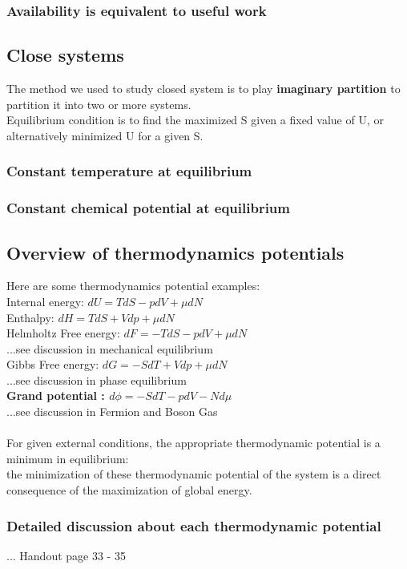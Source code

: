 \documentclass[10pt,a4paper]{article}
\begin{document}
    \subsubsection{Availability is equivalent to useful work}

    \subsection{Close systems}
    The method we used to study closed system is to play \textbf{imaginary partition}
    to partition it into two or more systems.\\
    Equilibrium condition is to find the maximized S given a fixed value of U, or alternatively
    minimized U for a given S.
    \subsubsection{Constant temperature at equilibrium}
    \subsubsection{Constant chemical potential at equilibrium}
    \subsection{Overview of thermodynamics potentials}
    Here are some thermodynamics potential examples:\\
    Internal energy: $dU = TdS - pdV+\mu dN$\\
    Enthalpy: $dH = TdS + Vdp +\mu dN$\\
    Helmholtz Free energy: $dF = -TdS -pdV + \mu dN$\\ ...see discussion in mechanical equilibrium \\
    Gibbs Free energy: $dG = -SdT + Vdp +\mu dN$\\ ...see discussion in phase equilibrium \\
    \textbf{Grand potential : $d\phi = -SdT -pdV - Nd\mu$}\\ ...see discussion in Fermion and Boson Gas \\
    \\
    For given external conditions, the appropriate thermodynamic potential is a minimum in equilibrium:\\
    the minimization of these thermodynamic potential of the system is a direct consequence of the maximization of global energy.
    \subsubsection{Detailed discussion about each thermodynamic potential}
    ... Handout page 33 - 35
\end{document}

